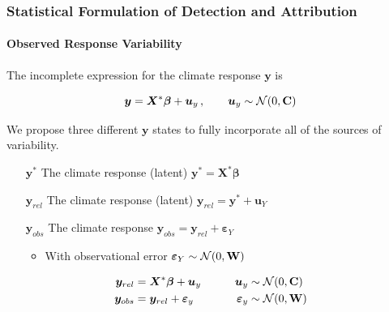 \documentclass{beamer}
\newcommand{\C}{\ensuremath{\text{Cov}}}
\def\*#1{\bm{#1}}
\def\C{\textbf{\text{C}}}
\def\W{\textbf{\text{W}}}
\begin{document}

\begin{frame}
\frametitle{Statistical Formulation of Detection and Attribution}
\framesubtitle{Observed Response Variability}

The \alert{incomplete} expression for the climate response $\*y$ is
\begin{alertblock}{}
\vspace*{-5pt}\setlength\belowdisplayshortskip{0pt}
\begin{equation*}
\*y = \*X^* \*\beta + \* u_y  \, , \qquad \*u_y \sim \mathcal{N} (0,\C) 
\end{equation*}	
\end{alertblock}

We propose three different $\*y$ states to fully incorporate all of the sources of variability.

\begin{itemize}
\item[$\*y^*$] The  climate response (latent) \hfill $\*y^* = \*X^* \*\beta \qquad \qquad \qquad$
\item[$\*y_{rel}$] The  climate response (latent) \hfill $\*y_{rel} = \*y^* + \*u_Y \,\; \qquad \qquad$
\item[$\*y_{obs}$] The  climate response \hfill $\*y_{obs} = \*y_{rel} + \*\varepsilon_Y \, \qquad \qquad$
\begin{itemize}
\item With observational error $\* \varepsilon_Y \sim \mathcal N(0,\W)$
\end{itemize}
\end{itemize}

\begin{exampleblock}{}
\vspace*{-\baselineskip}\setlength\belowdisplayshortskip{0pt}
\begin{alignat*}{3}
\*y_{rel} &= \*X^* \*\beta + \*u_y \nonumber  \qquad  &\*u_y &\sim \mathcal N(0,\C) \\
\*y_{obs} &= \*y_{rel} + \*\varepsilon_y &\*\varepsilon_y &\sim \mathcal N(0,\W)
\end{alignat*}
\end{exampleblock}

\end{frame}
\end{document}
